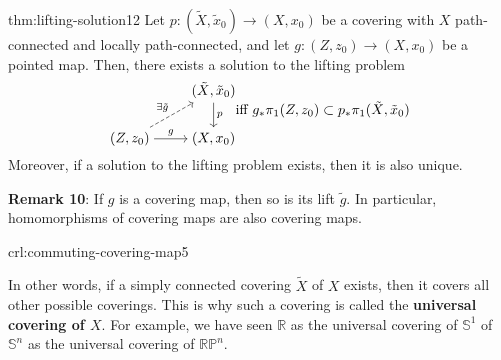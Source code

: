 \documentclass[landscape, 8pt]{extarticle}
\begin{document}
\begin{multicols*}{3}
\begin{thm}{thm:lifting-solution}{12}
	Let $p : (\tilde{X}, \tilde{x}_{0}) \to (X, x_{0})$ be a covering with $X$ path-connected and locally path-connected, and let $g : (Z, z_{0}) \to (X, x_{0})$ be a pointed map. Then, there exists a solution to the lifting problem
\[\begin{tikzcd}[ampersand replacement=\&,cramped, column sep=small, row sep=small]
	\&\& {(\tilde{X}, \tilde{x}_0)} \\
	\\
	{(Z, z_0)} \&\& {(X, x_0)}
	\arrow["p", from=1-3, to=3-3]
	\arrow["{\exists \tilde{g}}", dashed, from=3-1, to=1-3]
	\arrow["g", from=3-1, to=3-3]
\end{tikzcd} \text{iff } g_{\ast}\pi_{1}(Z, z_{0}) \subset p_{\ast}\pi_{1}(\tilde{X}, \tilde{x}_{0})\]
Moreover, if a solution to the lifting problem exists, then it is also unique.

\tcbline
\textbf{Remark 10}: If $g$ is a covering map, then so is its lift $\tilde{g}$. In particular, homomorphisms of covering maps are also covering maps.
\end{thm}

\begin{crl}{crl:commuting-covering-map}{5}
	
 In other words, if a simply connected covering $\tilde{X}$ of $X$ exists, then it covers all other possible coverings. This is why such a covering is called the \textbf{universal covering of $X$}. For example, we have seen $\mathbb{R}$ as the universal covering of $\mathbb{S}^{1}$ of $\mathbb{S}^{n}$ as the universal covering of $\mathbb{RP}^{n}$.


\end{crl}
\end{multicols*}
\end{document}
